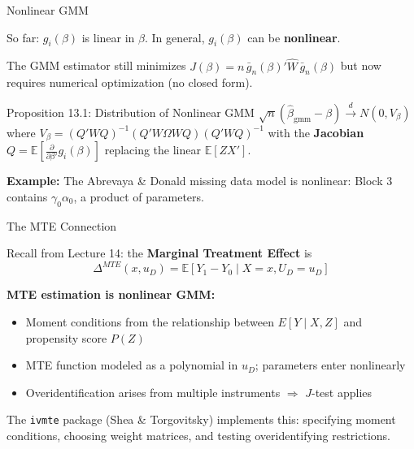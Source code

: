 \documentclass[aspectratio=169, handout, t]{beamer}
\numberwithin{equation}{section}
\begin{document}
\begin{frame}{Nonlinear GMM}

So far: $g_i(\beta)$ is linear in $\beta$. In general, $g_i(\beta)$ can be \textbf{nonlinear}.

\medskip
The GMM estimator still minimizes $J(\beta) = n\,\bar{g}_n(\beta)'\hat W\,\bar{g}_n(\beta)$ but now requires numerical optimization (no closed form).

\medskip
\begin{block}{Proposition 13.1: Distribution of Nonlinear GMM}
$\sqrt{n}(\hat\beta_{\text{gmm}} - \beta) \xrightarrow{d} N(0, V_\beta)$
where $V_\beta = (Q'WQ)^{-1}(Q'W\Omega WQ)(Q'WQ)^{-1}$ with the \textbf{Jacobian}
$Q = \mathbb{E}\!\left[\frac{\partial}{\partial \beta'} g_i(\beta)\right]$
replacing the linear $\mathbb{E}[ZX']$.
\end{block}

\smallskip
\textbf{Example:} The Abrevaya \& Donald missing data model is nonlinear: Block 3 contains $\gamma_0\alpha_0$, a product of parameters.

\end{frame}

\begin{frame}{The MTE Connection}

Recall from Lecture 14: the \textbf{Marginal Treatment Effect} is
$$\Delta^{MTE}(x, u_D) = \mathbb{E}[Y_1 - Y_0 \mid X = x, U_D = u_D]$$

\medskip
\textbf{MTE estimation is nonlinear GMM:}
\begin{itemize}\itemsep=1pt
\item Moment conditions from the relationship between $E[Y \mid X, Z]$ and propensity score $P(Z)$
\item MTE function modeled as a polynomial in $u_D$; parameters enter nonlinearly
\item Overidentification arises from multiple instruments $\Rightarrow$ $J$-test applies
\end{itemize}

\medskip
The \texttt{ivmte} package (Shea \& Torgovitsky) implements this: specifying moment conditions, choosing weight matrices, and testing overidentifying restrictions.

\end{frame}
\end{document}
